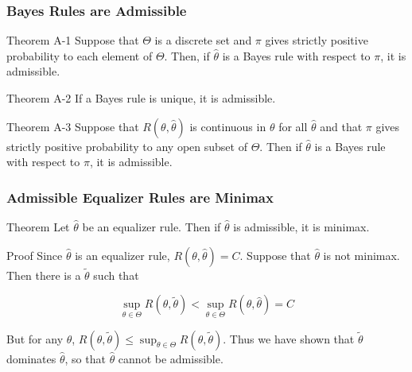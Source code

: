 \begin{frame}
  \frametitle{Bayes Rules are Admissible}

  \begin{block}{Theorem A-1}
    Suppose that $\Theta$ is a discrete set and $\pi$ gives strictly positive probability to each element of $\Theta$.
    Then, if $\widehat{\theta}$ is a Bayes rule with respect to $\pi$, it is admissible.
  \end{block}

  \begin{block}{Theorem A-2}
    If a Bayes rule is unique, it is admissible.
  \end{block}

  \begin{block}{Theorem A-3}
    Suppose that $R(\theta, \widehat{\theta})$ is continuous in $\theta$ for all $\widehat{\theta}$ and that $\pi$ gives strictly positive probability to any open subset of $\Theta$. 
    Then if $\widehat{\theta}$ is a Bayes rule with respect to $\pi$, it is admissible.
  \end{block}

\end{frame}
\begin{frame}
  \frametitle{Admissible Equalizer Rules are Minimax}

  \begin{block}{Theorem}
    Let $\widehat{\theta}$ be an equalizer rule. 
    Then if $\widehat{\theta}$ is admissible, it is minimax.
  \end{block}
  \begin{block}{Proof}
    Since $\widehat{\theta}$ is an equalizer rule, $R(\theta, \widehat{\theta}) = C$.
    Suppose that $\widehat{\theta}$ is not minimax.
    Then there is a $\widetilde{\theta}$ such that

    \[
      \sup_{\theta \in \Theta} R(\theta,\widetilde{\theta}) < \sup_{\theta \in \Theta} R(\theta, \widehat{\theta}) = C
    \]

    But for any $\theta$, $R(\theta, \widetilde{\theta}) \leq \sup_{\theta \in \Theta} R(\theta, \widetilde{\theta})$.
    Thus we have shown that $\widetilde{\theta}$ dominates $\widehat{\theta}$, so that $\widehat{\theta}$ cannot be admissible.
  \end{block}
\end{frame}


